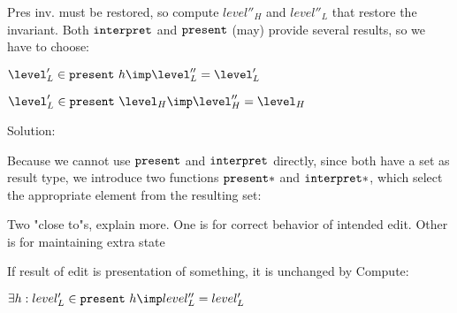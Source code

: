 Pres inv. must be restored, so compute $level''_{H}$ and $level''_{L}$ that restore the invariant. 
Both ${\tt interpret}$ and ${\tt present}$ (may) provide several results, so we have to choose:


$\level'_L \in \present~h \imp \level''_{L} = \level'_{L}$

$\level'_L \in \present~\level_H \imp \level''_{H} = \level_{H}$

Solution:

Because we cannot use ${\tt present}$ and ${\tt interpret}$ directly, since both have a set as result type, we introduce two functions ${\tt present}*$ and ${\tt interpret}*$, which select the appropriate element from the resulting set:



\bl
\* Two "close to"s, explain more. One is for correct behavior of intended edit. Other is for maintaining extra state
\el


If result of edit is presentation of something, it is unchanged by {\sc Compute}: 

$\exists h : level'_L \in \present~h \imp level''_L = level'_L$



